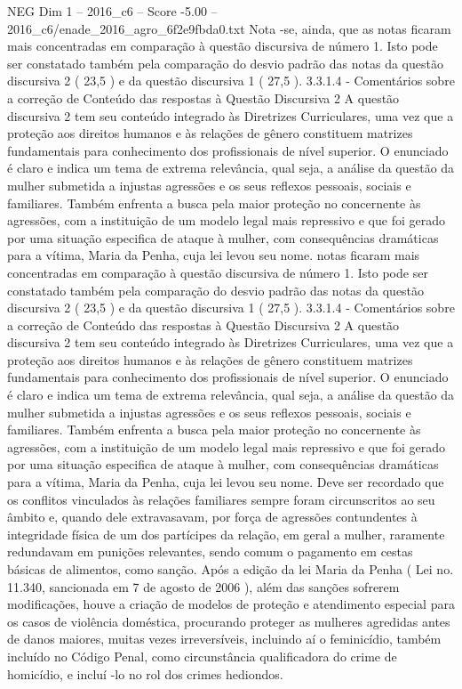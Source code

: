 \begin{textsample}{NEG Dim 1 – 2016\_c6 – Score -5.00 – 2016\_c6/enade\_2016\_agro\_6f2e9fbda0.txt}
Nota -se, ainda, que as notas ficaram mais concentradas em comparação à questão discursiva de número 1.
Isto pode ser constatado também pela comparação do desvio padrão das notas da questão discursiva 2 ( 23,5 ) e da questão discursiva 1 ( 27,5 ). 3.3.1.4 - Comentários sobre a correção de Conteúdo das respostas à Questão Discursiva 2 A questão discursiva 2 tem seu conteúdo integrado às Diretrizes Curriculares, uma vez que a proteção aos direitos humanos e às relações de gênero constituem matrizes fundamentais para conhecimento dos profissionais de nível superior.
O enunciado é claro e indica um tema de extrema relevância, qual seja, a análise da questão da mulher submetida a injustas agressões e os seus reflexos pessoais, sociais e familiares.
Também enfrenta a busca pela maior proteção no concernente às agressões, com a instituição de um modelo legal mais repressivo e que foi gerado por uma situação especifica de ataque à mulher, com consequências dramáticas para a vítima, Maria da Penha, cuja lei levou seu nome. notas ficaram mais concentradas em comparação à questão discursiva de número 1.
Isto pode ser constatado também pela comparação do desvio padrão das notas da questão discursiva 2 ( 23,5 ) e da questão discursiva 1 ( 27,5 ). 3.3.1.4 - Comentários sobre a correção de Conteúdo das respostas à Questão Discursiva 2 A questão discursiva 2 tem seu conteúdo integrado às Diretrizes Curriculares, uma vez que a proteção aos direitos humanos e às relações de gênero constituem matrizes fundamentais para conhecimento dos profissionais de nível superior.
O enunciado é claro e indica um tema de extrema relevância, qual seja, a análise da questão da mulher submetida a injustas agressões e os seus reflexos pessoais, sociais e familiares.
Também enfrenta a busca pela maior proteção no concernente às agressões, com a instituição de um modelo legal mais repressivo e que foi gerado por uma situação especifica de ataque à mulher, com consequências dramáticas para a vítima, Maria da Penha, cuja lei levou seu nome.
Deve ser recordado que os conflitos vinculados às relações familiares sempre foram circunscritos ao seu âmbito e, quando dele extravasavam, por força de agressões contundentes à integridade física de um dos partícipes da relação, em geral a mulher, raramente redundavam em punições relevantes, sendo comum o pagamento em cestas básicas de alimentos, como sanção.
Após a edição da lei Maria da Penha ( Lei no. 11.340, sancionada em 7 de agosto de 2006 ), além das sanções sofrerem modificações, houve a criação de modelos de proteção e atendimento especial para os casos de violência doméstica, procurando proteger as mulheres agredidas antes de danos maiores, muitas vezes irreversíveis, incluindo aí o feminicídio, também incluído no Código Penal, como circunstância qualificadora do crime de homicídio, e incluí -lo no rol dos crimes hediondos.

\end{textsample}
